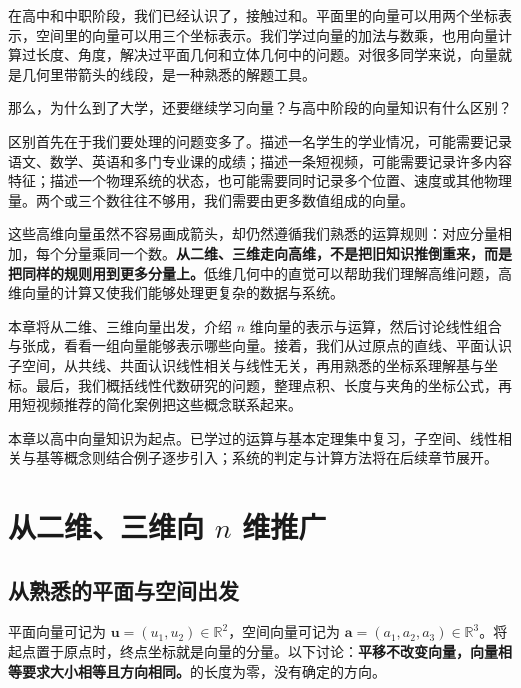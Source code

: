 \documentclass[a4paper,12pt,twoside,openany,fontset=none]{ctexbook}
\numberwithin{equation}{chapter}
\begin{document}
在高中和中职阶段，我们已经认识了，接触过和。平面里的向量可以用两个坐标表示，空间里的向量可以用三个坐标表示。我们学过向量的加法与数乘，也用向量计算过长度、角度，解决过平面几何和立体几何中的问题。对很多同学来说，向量就是几何里带箭头的线段，是一种熟悉的解题工具。

那么，为什么到了大学，还要继续学习向量？与高中阶段的向量知识有什么区别？

区别首先在于我们要处理的问题变多了。描述一名学生的学业情况，可能需要记录语文、数学、英语和多门专业课的成绩；描述一条短视频，可能需要记录许多内容特征；描述一个物理系统的状态，也可能需要同时记录多个位置、速度或其他物理量。两个或三个数往往不够用，我们需要由更多数值组成的向量。

这些高维向量虽然不容易画成箭头，却仍然遵循我们熟悉的运算规则：对应分量相加，每个分量乘同一个数。\textbf{从二维、三维走向高维，不是把旧知识推倒重来，而是把同样的规则用到更多分量上。}低维几何中的直觉可以帮助我们理解高维问题，高维向量的计算又使我们能够处理更复杂的数据与系统。

本章将从二维、三维向量出发，介绍 $n$ 维向量的表示与运算，然后讨论线性组合与张成，看看一组向量能够表示哪些向量。接着，我们从过原点的直线、平面认识子空间，从共线、共面认识线性相关与线性无关，再用熟悉的坐标系理解基与坐标。最后，我们概括线性代数研究的问题，整理点积、长度与夹角的坐标公式，再用短视频推荐的简化案例把这些概念联系起来。

本章以高中向量知识为起点。已学过的运算与基本定理集中复习，子空间、线性相关与基等概念则结合例子逐步引入；系统的判定与计算方法将在后续章节展开。

\section{从二维、三维向 $n$ 维推广}
\label{sec:zero-rn}

\subsection*{从熟悉的平面与空间出发}

平面向量可记为 $\boldsymbol{u}=(u_1,u_2)\in\mathbb{R}^2$，空间向量可记为 $\boldsymbol{a}=(a_1,a_2,a_3)\in\mathbb{R}^3$。将起点置于原点时，终点坐标就是向量的分量。以下讨论：\textbf{平移不改变向量，向量相等要求大小相等且方向相同。}的长度为零，没有确定的方向。
\end{document}
